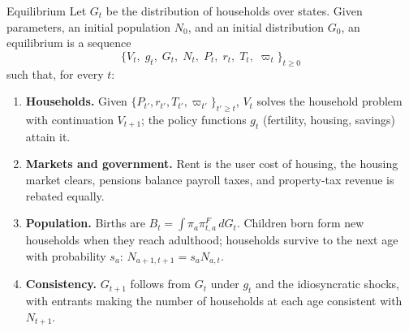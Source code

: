 \begin{frame}[t]{%
%
%
}
\end{frame}

\begin{frame}{Equilibrium}
\small
\setlength{\abovedisplayskip}{3pt}\setlength{\belowdisplayskip}{3pt}
Let $G_t$ be the distribution of households over states. Given parameters, an initial population $N_0$, and an initial distribution $G_0$, an equilibrium is a sequence
\[
\{V_t,\;g_t,\;G_t,\;N_t,\;P_t,\;r_t,\;T_t,\;\varpi_t\}_{t\ge0}
\]
such that, for every $t$:
\begin{enumerate}\setlength\itemsep{1pt}
  \item \textbf{Households.} Given $\{P_{t'},r_{t'},T_{t'},\varpi_{t'}\}_{t'\ge t}$, $V_t$ solves the household problem with continuation $V_{t+1}$; the policy functions $g_t$ (fertility, housing, savings) attain it.
  \item \textbf{Markets and government.} Rent is the user cost of housing, the housing market clears, pensions balance payroll taxes, and property-tax revenue is rebated equally.
  \item \textbf{Population.} Births are $B_t=\int\pi_a\pi^F_{t,a}\,dG_t$. Children born form new households when they reach adulthood; households survive to the next age with probability $s_a$: $N_{a+1,t+1}=s_a N_{a,t}$.
  \item \textbf{Consistency.} $G_{t+1}$ follows from $G_t$ under $g_t$ and the idiosyncratic shocks, with entrants making the number of households at each age consistent with $N_{t+1}$.
\end{enumerate}
\end{frame}

